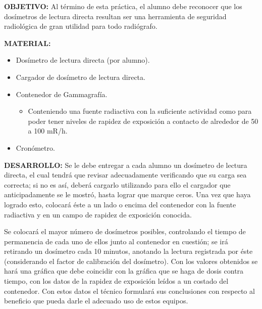 
\textbf{OBJETIVO:}
Al término de esta práctica, el alumno debe reconocer que los dosímetros de lectura directa resultan ser una herramienta de seguridad radiológica de gran utilidad para todo radiógrafo.

\textbf{MATERIAL:}
\begin{itemize}
    \item Dosímetro de lectura directa (por alumno).
    \item Cargador de dosímetro de lectura directa.
    \item Contenedor de Gammagrafía.
    \begin{itemize}
        \item[\textbullet] Conteniendo una fuente radiactiva con la suficiente actividad como para poder tener niveles de rapidez de exposición a contacto de alrededor de 50 a 100 mR/h.
    \end{itemize}
    \item Cronómetro.
\end{itemize}

\textbf{DESARROLLO:}
Se le debe entregar a cada alumno un dosímetro de lectura directa, el cual tendrá que revisar adecuadamente verificando que su carga sea correcta; si no es así, deberá cargarlo utilizando para ello el cargador que anticipadamente se le mostró, hasta lograr que marque ceros. Una vez que haya logrado esto, colocará éste a un lado o encima del contenedor con la fuente radiactiva y en un campo de rapidez de exposición conocida.

Se colocará el mayor número de dosímetros posibles, controlando el tiempo de permanencia de cada uno de ellos junto al contenedor en cuestión; se irá retirando un dosímetro cada 10 minutos, anotando la lectura registrada por éste (considerando el factor de calibración del dosímetro). Con los valores obtenidos se hará una gráfica que debe coincidir con la gráfica que se haga de dosis contra tiempo, con los datos de la rapidez de exposición leídos a un costado del contenedor. Con estos datos el técnico formulará sus conclusiones con respecto al beneficio que pueda darle el adecuado uso de estos equipos.